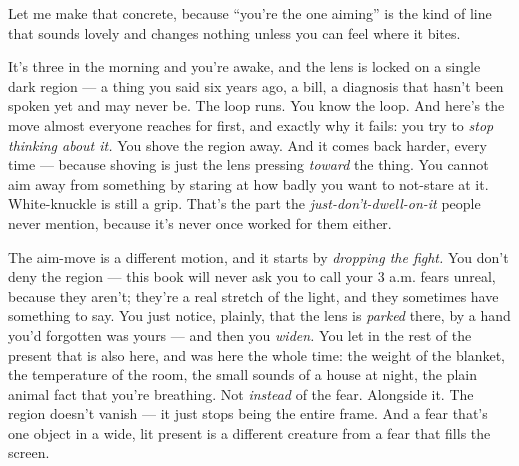 \documentclass[11pt,openany]{book}
\begin{document}
Let me make that concrete, because “you’re the one aiming” is the kind of line that sounds lovely and changes nothing unless you can feel where it bites.

It’s three in the morning and you’re awake, and the lens is locked on a single dark region — a thing you said six years ago, a bill, a diagnosis that hasn’t been spoken yet and may never be. The loop runs. You know the loop. And here’s the move almost everyone reaches for first, and exactly why it fails: you try to \textit{stop thinking about it.} You shove the region away. And it comes back harder, every time — because shoving is just the lens pressing \textit{toward} the thing. You cannot aim away from something by staring at how badly you want to not-stare at it. White-knuckle is still a grip. That’s the part the \textit{just-don’t-dwell-on-it} people never mention, because it’s never once worked for them either.

The aim-move is a different motion, and it starts by \textit{dropping the fight.} You don’t deny the region — this book will never ask you to call your 3 a.m. fears unreal, because they aren’t; they’re a real stretch of the light, and they sometimes have something to say. You just notice, plainly, that the lens is \textit{parked} there, by a hand you’d forgotten was yours — and then you \textit{widen.} You let in the rest of the present that is also here, and was here the whole time: the weight of the blanket, the temperature of the room, the small sounds of a house at night, the plain animal fact that you’re breathing. Not \textit{instead} of the fear. Alongside it. The region doesn’t vanish — it just stops being the entire frame. And a fear that’s one object in a wide, lit present is a different creature from a fear that fills the screen.
\end{document}
